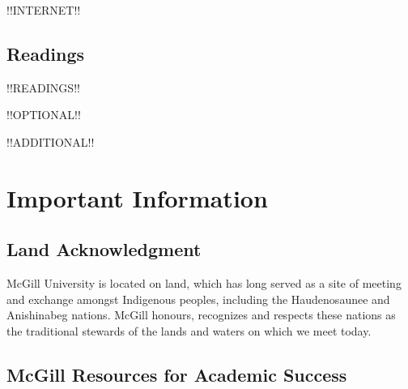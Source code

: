 \documentclass{article}
\begin{document}
!!INTERNET!!

\newpage

\subsection{Readings}

!!READINGS!!

!!OPTIONAL!!

!!ADDITIONAL!!

\newpage


\section{Important Information}

\subsection{Land Acknowledgment}

McGill University is located on land, which has long served as a site
of meeting and exchange amongst Indigenous peoples, including the
Haudenosaunee and Anishinabeg nations. McGill honours, recognizes and
respects these nations as the traditional stewards of the lands and
waters on which we meet today.

\subsection{McGill Resources for Academic Success}
\end{document}
